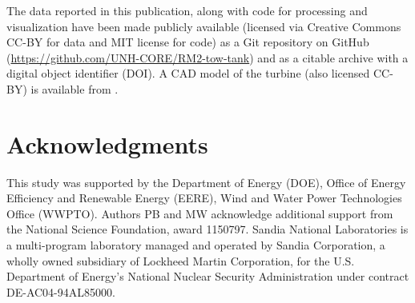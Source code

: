\documentclass[10pt,letterpaper]{article}
\begin{document}
The data reported in this publication, along with code for processing and
visualization have been made publicly available (licensed via Creative Commons
CC-BY for data and MIT license for code) as a Git repository on GitHub
(\url{https://github.com/UNH-CORE/RM2-tow-tank}) and as a citable archive with a
digital object identifier (DOI). A CAD model of the turbine (also licensed
CC-BY) is available from \cite{Bachant2015-RM2-CAD}.


\section*{Acknowledgments}

This study was supported by the Department of Energy (DOE), Office of Energy
Efficiency and Renewable Energy (EERE), Wind and Water Power Technologies Office
(WWPTO). Authors PB and MW acknowledge additional support from the National
Science Foundation, award 1150797. Sandia National Laboratories is a
multi-program laboratory managed and operated by Sandia Corporation, a wholly
owned subsidiary of Lockheed Martin Corporation, for the U.S. Department of
Energy's National Nuclear Security Administration under contract
DE-AC04-94AL85000.

\nolinenumbers

%

% 
\end{document}

